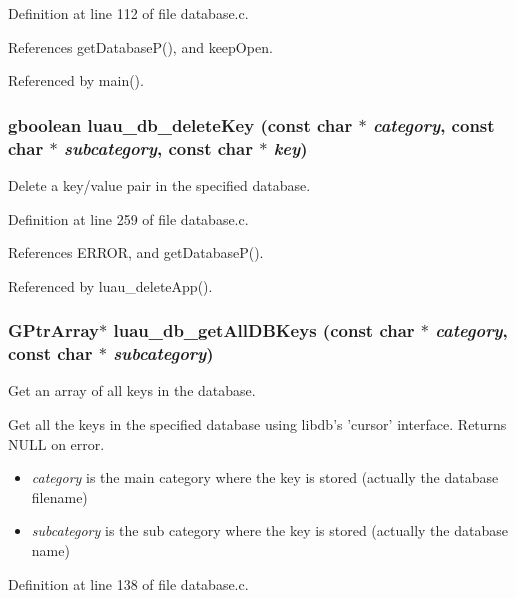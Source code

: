 Definition at line 112 of file database.c.

References get\-Database\-P(), and keep\-Open.

Referenced by main().
\subsubsection{\setlength{\rightskip}{0pt plus 5cm}gboolean luau\_\-db\_\-delete\-Key (const char $\ast$ {\em category}, const char $\ast$ {\em subcategory}, const char $\ast$ {\em key})}\label{database_8h_a8}


Delete a key/value pair in the specified database. 



Definition at line 259 of file database.c.

References ERROR, and get\-Database\-P().

Referenced by luau\_\-delete\-App().
\subsubsection{\setlength{\rightskip}{0pt plus 5cm}GPtr\-Array$\ast$ luau\_\-db\_\-get\-All\-DBKeys (const char $\ast$ {\em category}, const char $\ast$ {\em subcategory})}\label{database_8h_a3}


Get an array of all keys in the database. 

Get all the keys in the specified database using libdb's 'cursor' interface. Returns NULL on error.

\begin{itemize}
\item {\em category\/} is the main category where the key is stored (actually the database filename) \item {\em subcategory\/} is the sub category where the key is stored (actually the database name) 
\end{itemize}


Definition at line 138 of file database.c.

